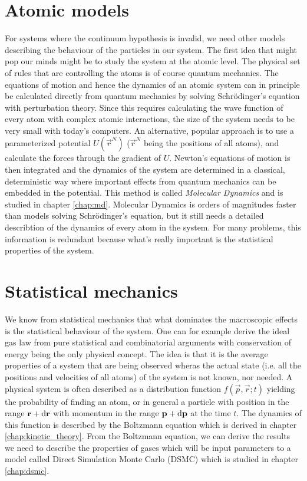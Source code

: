 \section{Atomic models}
For systems where the continuum hypothesis is invalid, we need other models describing the behaviour of the particles in our system. The first idea that might pop our minds might be to study the system at the atomic level. The physical set of rules that are controlling the atoms is of course quantum mechanics. The equations of motion and hence the dynamics of an atomic system can in principle be calculated directly from quantum mechanics by solving Schr\"{o}dinger's equation with perturbation theory. Since this requires calculating the wave function of every atom with complex atomic interactions, the size of the system needs to be very small with today's computers. An alternative, popular approach is to use a parameterized potential $U(\vec r^N)$ ($\vec r^N$ being the positions of all atoms), and calculate the forces through the gradient of $U$. Newton's equations of motion is then integrated and the dynamics of the system are determined in a classical, deterministic way where important effects from quantum mechanics can be embedded in the potential. This method is called \textit{Molecular Dynamics} and is studied in chapter \ref{chap:md}. Molecular Dynamics is orders of magnitudes faster than models solving Schr\"{o}dinger's equation, but it still needs a detailed describtion of the dynamics of every atom in the system. For many problems, this information is redundant because what's really important is the statistical properties of the system.
\section{Statistical mechanics}
We know from statistical mechanics that what dominates the macroscopic effects is the statistical behaviour of the system. One can for example derive the ideal gas law from pure statistical and combinatorial arguments with conservation of energy being the only physical concept\cite{ravndal2008statmech}. The idea is that it is the average properties of a system that are being observed wheras the actual state (i.e. all the positions and velocities of all atoms) of the system is not known, nor needed. A physical system is often described as a distribution function $f(\vec p, \vec r; t)$ yielding the probability of finding an atom, or in general a particle with position in the range $\mathbf r + \mathrm{d}\mathbf{\mathbf r}$ with momentum in the range $\mathbf p + \mathrm{d}\mathbf{\mathbf p}$ at the time $t$. The dynamics of this function is described by the Boltzmann equation which is derived in chapter \ref{chap:kinetic_theory}. From the Boltzmann equation, we can derive the results we need to describe the properties of gases which will be input parameters to a model called Direct Simulation Monte Carlo (DSMC) which is studied in chapter \ref{chap:dsmc}. 
